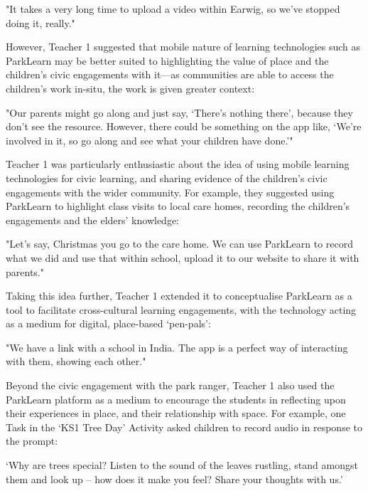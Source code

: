 \begin{displayquote}
"It takes a very long time to upload a video within Earwig, so we've stopped doing it, really."
\end{displayquote}

However, Teacher 1 suggested that mobile nature of learning technologies such as ParkLearn may be better suited to highlighting the value of place and the children’s civic engagements with it---as communities are able to access the children's work in-situ, the work is given greater context: 

\begin{displayquote}
"Our parents might go along and just say, `There's nothing there', because they don’t see the resource. However, there could be something on the app like, `We're involved in it, so go along and see what your children have done.'" 
\end{displayquote}

Teacher 1 was particularly enthusiastic about the idea of using mobile learning technologies for civic learning, and sharing evidence of the children's civic engagements with the wider community. For example, they suggested using ParkLearn to highlight class visits to local care homes, recording the children's engagements and the elders' knowledge: 

\begin{displayquote}
"Let’s say, Christmas you go to the care home. We can use ParkLearn to record what we did and use that within school, upload it to our website to share it with parents."
\end{displayquote}

Taking this idea further, Teacher 1 extended it to conceptualise ParkLearn as a tool to facilitate cross-cultural learning engagements, with the technology acting as a medium for digital, place-based `pen-pals': 

\begin{displayquote}
"We have a link with a school in India. The app is a perfect way of interacting with them, showing each other."
\end{displayquote}

Beyond the civic engagement with the park ranger, Teacher 1 also used the ParkLearn platform as a medium to encourage the students in reflecting upon their experiences in place, and their relationship with space. For example, one Task in the `KS1 Tree Day' Activity asked children to record audio in response to the prompt:

\begin{displayquote}
`Why are trees special? Listen to the sound of the leaves rustling, stand amongst them and look up – how does it make you feel? Share your thoughts with us.' 
\end{displayquote}

